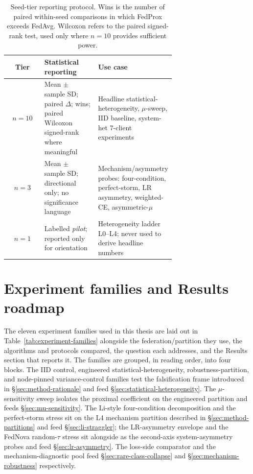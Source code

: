 \documentclass[11pt,a4paper]{report}
\begin{document}
\begin{table}[H]
\centering
\small
\caption{Seed-tier reporting protocol. Wins is the number of paired
within-seed comparisons in which FedProx exceeds FedAvg. Wilcoxon refers
to the paired signed-rank test, used only where $n = 10$ provides
sufficient power.}
\label{tab:seed-tiers}
\begin{tabular}{c p{0.32\linewidth} p{0.36\linewidth}}
\hline
Tier         & Statistical reporting                                                                            & Use case                                                                                                  \\
\hline
$n = 10$     & Mean $\pm$ sample SD; paired $\Delta$; wins; paired Wilcoxon signed-rank where meaningful        & Headline statistical-heterogeneity, $\mu$-sweep, IID baseline, system-het 7-client experiments            \\
$n = 3$      & Mean $\pm$ sample SD; directional only; no significance language                                & Mechanism/asymmetry probes: four-condition, perfect-storm, LR asymmetry, weighted-CE, asymmetric-$\mu$    \\
$n = 1$      & Labelled \emph{pilot}; reported only for orientation                                            & Heterogeneity ladder L0--L4; never used to derive headline numbers                                        \\
\hline
\end{tabular}
\end{table}

\section{Experiment families and Results roadmap}
\label{sec:method-roadmap}

The eleven experiment families used in this thesis are laid out in
Table~\ref{tab:experiment-families} alongside the federation/partition
they use, the algorithms and protocols compared, the question each
addresses, and the Results section that reports it. The families are
grouped, in reading order, into four blocks. The IID control,
engineered statistical-heterogeneity, robustness-partition, and
node-pinned variance-control families test the falsification frame
introduced in §\ref{sec:method-rationale} and feed
§\ref{sec:statistical-heterogeneity}. The $\mu$-sensitivity sweep
isolates the proximal coefficient on the engineered partition and feeds
§\ref{sec:mu-sensitivity}. The Li-style four-condition decomposition
and the perfect-storm stress sit on the L4 mechanism partition
described in §\ref{sec:method-partitions} and feed
§\ref{sec:li-straggler}; the LR-asymmetry envelope and the FedNova
random-$\tau$ stress sit alongside as the second-axis system-asymmetry
probes and feed §\ref{sec:lr-asymmetry}. The loss-side comparator and
the mechanism-diagnostic pool feed §\ref{sec:rare-class-collapse} and
§\ref{sec:mechanism-robustness} respectively.
\end{document}
